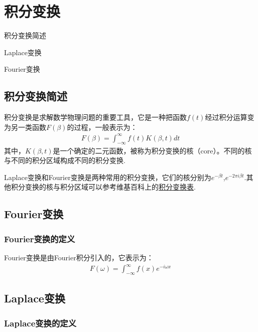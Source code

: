\chapter{积分变换}

\begin{introduction}
    \item 积分变换简述
    \item Laplace变换
    \item Fourier变换
\end{introduction}

\section{积分变换简述}

    积分变换是求解数学物理问题的重要工具，它是一种把函数$f(t)$经过积分运算变为另一类函数$F(\beta)$的过程，一般表示为：
    \begin{align*}
        F(\beta) = \int_{-\infty}^{\infty} f(t) K(\beta,t) dt
    \end{align*}
    其中，$K(\beta,t)$是一个确定的二元函数，被称为积分变换的核（core）。不同的核与不同的积分区域构成不同的积分变换.

    Laplace变换和Fourier变换是两种常用的积分变换，它们的核分别为$e^{-\beta t}$,$e^{-2\pi i \beta t}$.其他积分变换的核与积分区域可以参考维基百科上的\href{https://zh.wikipedia.org/wiki/%E7%A7%AF%E5%88%86%E5%8F%98%E6%8D%A2}{积分变换表}.


\section{Fourier变换}

\subsection{Fourier变换的定义}

    Fourier变换是由Fourier积分引入的，它表示为：
    \begin{align}
        F(\omega)=\int_{-\infty}^\infty f(x)e^{-i\omega x}
    \end{align}


\section{Laplace变换}

\subsection{Laplace变换的定义}

    


